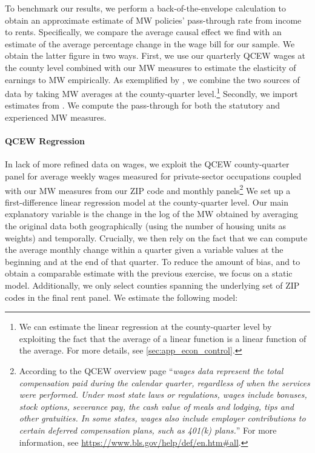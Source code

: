 To benchmark our results, we perform a back-of-the-envelope calculation to obtain an 
approximate estimate of MW policies' pass-through rate from income to rents. Specifically, 
we compare the average causal effect we find with an estimate of the average percentage 
change in the wage bill for our sample. We obtain the latter figure in two ways. First, we 
use our quarterly QCEW wages at the county level combined with our MW measures 
to estimate the elasticity of earnings to MW empirically. As exemplified by 
\textcite{gentzkow2015newspapers}, we combine the two sources of data by taking MW averages 
at the county-quarter level.\footnote{We can estimate the linear regression at the 
	county-quarter level by exploiting the fact that the average of a linear function is a 
	linear function of the average. For more details, see \autoref{sec:app_econ_control}.} 
Secondly, we import estimates from \textcite{CegnizEtAl2019}. We compute the pass-through for
both the statutory and experienced MW measures.


\paragraph{QCEW Regression} In lack of more refined data on wages, we exploit the QCEW 
county-quarter panel for average weekly wages measured for private-sector occupations coupled 
with our MW measures from our ZIP code and monthly panels\footnote{According to the QCEW overview page 
	``\textit{wages data represent 
	the total compensation paid during the calendar quarter, regardless of when the services were 
	performed. Under most state laws or regulations, wages include bonuses, stock options, severance 
	pay, the cash value of meals and lodging, tips and other gratuities. In some states, wages also 
	include employer contributions to certain deferred compensation plans, such as 401(k) plans.}'' For 
	more information, see 
	\href{https://www.bls.gov/help/def/en.htm\#all}{https://www.bls.gov/help/def/en.htm\#all}.}
We set up a first-difference linear 
regression model at the county-quarter level. Our main explanatory variable is the change in 
the log of the MW obtained by averaging the original data both geographically (using the number 
of housing units as weights) and temporally. Crucially, we then rely on the fact that we can 
compute the average monthly change within a quarter given a variable values at the beginning 
and at the end of that quarter. To reduce the amount of bias, and to obtain a comparable 
estimate with the previous exercise, we focus on a static model. Additionally, we only 
select counties spanning the underlying set of ZIP codes in the final rent panel. We estimate 
the following model:

